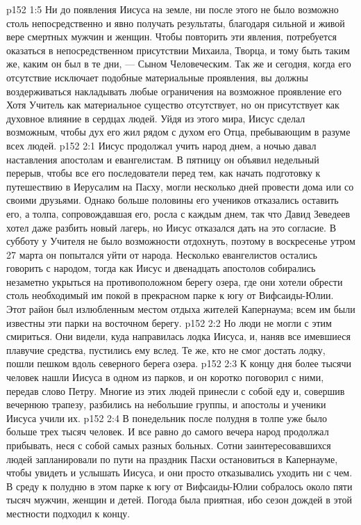 \vs p152 1:5 Ни до появления Иисуса на земле, ни после этого не было возможно столь непосредственно и явно получать результаты, благодаря сильной и живой вере смертных мужчин и женщин. Чтобы повторить эти явления, потребуется оказаться в непосредственном присутствии Михаила, Творца, и тому быть таким же, каким он был в те дни, --- Сыном Человеческим. Так же и сегодня, когда его отсутствие исключает подобные материальные проявления, вы должны воздерживаться накладывать любые ограничения на возможное проявление его  Хотя Учитель как материальное существо отсутствует, но он присутствует как духовное влияние в сердцах людей. Уйдя из этого мира, Иисус сделал возможным, чтобы дух его жил рядом с духом его Отца, пребывающим в разуме всех людей.
\vs p152 2:1 Иисус продолжал учить народ днем, а ночью давал наставления апостолам и евангелистам. В пятницу он объявил недельный перерыв, чтобы все его последователи перед тем, как начать подготовку к путешествию в Иерусалим на Пасху, могли несколько дней провести дома или со своими друзьями. Однако больше половины его учеников отказались оставить его, а толпа, сопровождавшая его, росла с каждым днем, так что Давид Зеведеев хотел даже разбить новый лагерь, но Иисус отказался дать на это согласие. В субботу у Учителя не было возможности отдохнуть, поэтому в воскресенье утром 27 марта он попытался уйти от народа. Несколько евангелистов остались говорить с народом, тогда как Иисус и двенадцать апостолов собирались незаметно укрыться на противоположном берегу озера, где они хотели обрести столь необходимый им покой в прекрасном парке к югу от Вифсаиды\hyp{}Юлии. Этот район был излюбленным местом отдыха жителей Капернаума; всем им были известны эти парки на восточном берегу.
\vs p152 2:2 Но люди не могли с этим смириться. Они видели, куда направилась лодка Иисуса, и, наняв все имевшиеся плавучие средства, пустились ему вслед. Те же, кто не смог достать лодку, пошли пешком вдоль северного берега озера.
\vs p152 2:3 К концу дня более тысячи человек нашли Иисуса в одном из парков, и он коротко поговорил с ними, передав слово Петру. Многие из этих людей принесли с собой еду и, совершив вечернюю трапезу, разбились на небольшие группы, и апостолы и ученики Иисуса учили их.
\vs p152 2:4 В понедельник после полудня в толпе уже было больше трех тысяч человек. И все равно до самого вечера народ продолжал прибывать, неся с собой самых разных больных. Сотни заинтересовавшихся людей запланировали по пути на праздник Пасхи остановиться в Капернауме, чтобы увидеть и услышать Иисуса, и они просто отказывались уходить ни с чем. В среду к полудню в этом парке к югу от Вифсаиды\hyp{}Юлии собралось около пяти тысяч мужчин, женщин и детей. Погода была приятная, ибо сезон дождей в этой местности подходил к концу.
